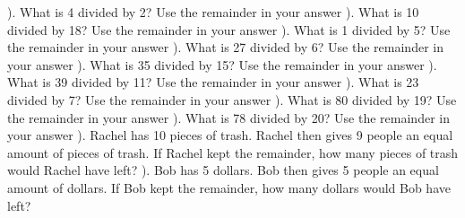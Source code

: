 \documentclass{article}%
\begin{document}
\newline%
). What is 4 divided by 2? Use the remainder in your answer%
\newline%
\newline%
). What is 10 divided by 18? Use the remainder in your answer%
\newline%
\newline%
). What is 1 divided by 5? Use the remainder in your answer%
\newline%
\newline%
). What is 27 divided by 6? Use the remainder in your answer%
\newline%
\newline%
). What is 35 divided by 15? Use the remainder in your answer%
\newline%
\newline%
). What is 39 divided by 11? Use the remainder in your answer%
\newline%
\newline%
). What is 23 divided by 7? Use the remainder in your answer%
\newline%
\newline%
). What is 80 divided by 19? Use the remainder in your answer%
\newline%
\newline%
). What is 78 divided by 20? Use the remainder in your answer%
\newline%
\newline%
). Rachel has 10 pieces of trash. Rachel then gives 9 people an equal amount of pieces of trash. If Rachel kept the remainder, how many pieces of trash would Rachel have left?%
\newline%
\newline%
). Bob has 5 dollars. Bob then gives 5 people an equal amount of dollars. If Bob kept the remainder, how many dollars would Bob have left?%
\newline%
\newline%
\end{document}
